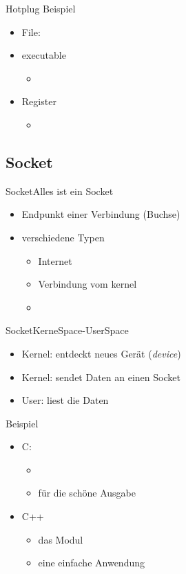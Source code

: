 \documentclass{beamer}
\begin{document}
\begin{frame}{Hotplug Beispiel}
 \begin{itemize}
  \item File: 
  \item executable 
  \begin{itemize}
   \item {}
  \end{itemize}
  \item Register
  \begin{itemize}
   \item {}
  \end{itemize}
 \end{itemize}
\end{frame}

\subsection{Socket}

\begin{frame}{Socket}{Alles ist ein Socket}
 \begin{itemize}
  \item Endpunkt einer Verbindung (Buchse)
  \item verschiedene Typen
  \begin{itemize}
   \item Internet
   \item Verbindung vom kernel
   \item {}
  \end{itemize}
 \end{itemize}
\end{frame}

\begin{frame}{Socket}{KerneSpace-UserSpace}
 \begin{itemize}
  \item Kernel: entdeckt neues Gerät ({\em device})
  \item Kernel: sendet Daten an einen Socket
  \item User: liest die Daten
 \end{itemize}
\end{frame}

\begin{frame}{Beispiel}
\begin{itemize}
 \item C:
 \begin{itemize}
  \item {}
  \item {} für die schöne Ausgabe
 \end{itemize}
 \item C++
 \begin{itemize}
  \item {} das Modul
  \item {} eine einfache Anwendung
 \end{itemize}
\end{itemize}
\end{frame}
\end{document}
